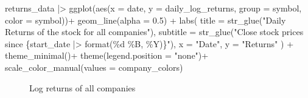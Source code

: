 \documentclass[
  12pt]{article}
\newenvironment{Shaded}{\begin{snugshade}}{\end{snugshade}}
\newcommand{\AttributeTok}[1]{\textcolor[rgb]{0.40,0.45,0.13}{#1}}
\newcommand{\FloatTok}[1]{\textcolor[rgb]{0.68,0.00,0.00}{#1}}
\newcommand{\FunctionTok}[1]{\textcolor[rgb]{0.28,0.35,0.67}{#1}}
\newcommand{\NormalTok}[1]{\textcolor[rgb]{0.00,0.23,0.31}{#1}}
\newcommand{\SpecialCharTok}[1]{\textcolor[rgb]{0.37,0.37,0.37}{#1}}
\newcommand{\StringTok}[1]{\textcolor[rgb]{0.13,0.47,0.30}{#1}}
\theoremstyle{definition}
\theoremstyle{remark}
\begin{document}
\begin{Shaded}
\begin{Highlighting}[]
\NormalTok{returns\_data }\SpecialCharTok{|\textgreater{}} 
  \FunctionTok{ggplot}\NormalTok{(}\FunctionTok{aes}\NormalTok{(}\AttributeTok{x =}\NormalTok{ date, }\AttributeTok{y =}\NormalTok{ daily\_log\_returns,  }\AttributeTok{group =}\NormalTok{ symbol, }\AttributeTok{color =}\NormalTok{ symbol))}\SpecialCharTok{+}
  \FunctionTok{geom\_line}\NormalTok{(}\AttributeTok{alpha =} \FloatTok{0.5}\NormalTok{) }\SpecialCharTok{+}
  \FunctionTok{labs}\NormalTok{(}
    \AttributeTok{title =} \FunctionTok{str\_glue}\NormalTok{(}\StringTok{"Daily Returns of the stock for all companies"}\NormalTok{), }
    \AttributeTok{subtitle =} \FunctionTok{str\_glue}\NormalTok{(}\StringTok{"Close stock prices since \{start\_date |\textgreater{} format(\textquotesingle{}\%d \%B, \%Y\textquotesingle{})\}"}\NormalTok{),}
    \AttributeTok{x =} \StringTok{"Date"}\NormalTok{,}
    \AttributeTok{y =} \StringTok{"Returns"}
\NormalTok{    ) }\SpecialCharTok{+} 
  \FunctionTok{theme\_minimal}\NormalTok{()}\SpecialCharTok{+}
  \FunctionTok{theme}\NormalTok{(}\AttributeTok{legend.position =} \StringTok{"none"}\NormalTok{)}\SpecialCharTok{+} 
  \FunctionTok{scale\_color\_manual}\NormalTok{(}\AttributeTok{values =}\NormalTok{ company\_colors)}
\end{Highlighting}
\end{Shaded}

\begin{figure}[H]


\caption{\label{fig-log-returns-all-stocks}Log returns of all companies}

\end{figure}%
\end{document}
